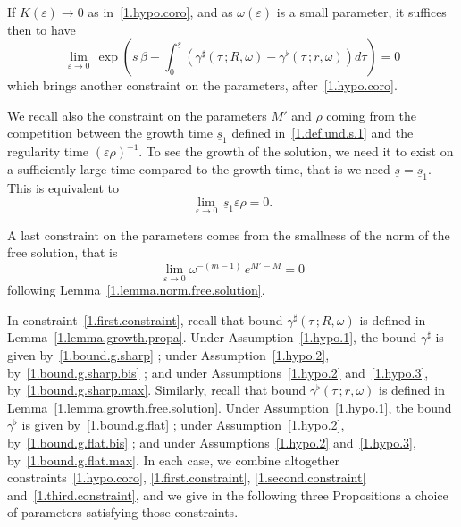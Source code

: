 \documentclass[10pt]{amsart}
\theoremstyle{definition}
\theoremstyle{plain}
\newcommand*\e{\varepsilon}
\newcommand*\g{\gamma}
\newcommand*\und{\underline}
\begin{document}
If $K(\e) \to 0$ as in~\eqref{1.hypo.coro}, and as $\omega(\e)$ is a small parameter, it suffices then to have
\begin{equation}\label{1.first.constraint}
\lim_{\e\to0} \,\exp\left(\und{s}\,\beta + \int_{0}^{\und{s}} (\g^{\sharp}(\tau\,;R, \omega) - \g^{\flat}(\tau\,;r, \omega)) d\tau \right) = 0
\end{equation}
which brings another constraint on the parameters, after~\eqref{1.hypo.coro}.

We recall also the constraint on the parameters $M'$ and $\rho$ coming from the competition between the growth time $\und{s}_1$ defined in~\eqref{1.def.und.s.1} and the regularity time $(\e\rho)^{-1}$. To see the growth of the solution, we need it to exist on a sufficiently large time compared to the growth time, that is we need $\und{s} = \und{s}_1$. This is equivalent to
\begin{equation}\label{1.second.constraint}
\lim_{\e\to0} \,\und{s}_1\e\rho =0.
\end{equation}

A last constraint on the parameters comes from the smallness of the norm of the free solution, that is
\begin{equation}\label{1.third.constraint}
\lim_{\e \to0} \omega^{-(m-1)}\,e^{M' - M} = 0
\end{equation}
following Lemma~\ref{1.lemma.norm.free.solution}.

In constraint~\eqref{1.first.constraint}, recall that bound $\g^{\sharp}(\tau\,;R,\omega)$ is defined in Lemma~\ref{1.lemma.growth.propa}. Under Assumption~\ref{1.hypo.1}, the bound $\g^{\sharp}$ is given by~\eqref{1.bound.g.sharp} ; under Assumption~\ref{1.hypo.2}, by~\eqref{1.bound.g.sharp.bis} ; and under Assumptions~\ref{1.hypo.2} and~\ref{1.hypo.3}, by~\eqref{1.bound.g.sharp.max}. Similarly, recall that bound $\g^{\flat}(\tau\,;r,\omega)$ is defined in Lemma~\ref{1.lemma.growth.free.solution}. Under Assumption~\ref{1.hypo.1}, the bound $\g^{\flat}$ is given by~\eqref{1.bound.g.flat} ; under Assumption~\ref{1.hypo.2}, by~\eqref{1.bound.g.flat.bis} ; and under Assumptions~\ref{1.hypo.2} and~\ref{1.hypo.3}, by~\eqref{1.bound.g.flat.max}. In each case, we combine altogether constraints~\eqref{1.hypo.coro}, \eqref{1.first.constraint}, \eqref{1.second.constraint} and~\eqref{1.third.constraint}, and we give in the following three Propositions a choice of parameters satisfying those constraints.
\end{document}
